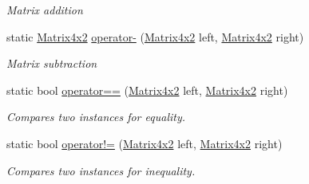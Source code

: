 \begin{DoxyCompactItemize}
\begin{DoxyCompactList}\small\item\em Matrix addition \end{DoxyCompactList}\item 
static \hyperlink{struct_open_t_k_1_1_matrix4x2}{Matrix4x2} \hyperlink{struct_open_t_k_1_1_matrix4x2_a38092099ffe691cc22a5b386fe0f4341}{operator-\/} (\hyperlink{struct_open_t_k_1_1_matrix4x2}{Matrix4x2} left, \hyperlink{struct_open_t_k_1_1_matrix4x2}{Matrix4x2} right)
\begin{DoxyCompactList}\small\item\em Matrix subtraction \end{DoxyCompactList}\item 
static bool \hyperlink{struct_open_t_k_1_1_matrix4x2_a93cb600e4edb53b55248511fef375d22}{operator==} (\hyperlink{struct_open_t_k_1_1_matrix4x2}{Matrix4x2} left, \hyperlink{struct_open_t_k_1_1_matrix4x2}{Matrix4x2} right)
\begin{DoxyCompactList}\small\item\em Compares two instances for equality. \end{DoxyCompactList}\item 
static bool \hyperlink{struct_open_t_k_1_1_matrix4x2_a5bcd2d9d72a94fa1c15c16757d5be8bb}{operator!=} (\hyperlink{struct_open_t_k_1_1_matrix4x2}{Matrix4x2} left, \hyperlink{struct_open_t_k_1_1_matrix4x2}{Matrix4x2} right)
\begin{DoxyCompactList}\small\item\em Compares two instances for inequality. \end{DoxyCompactList}\end{DoxyCompactItemize}
